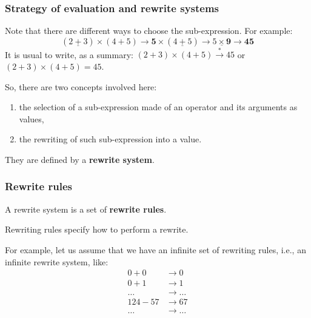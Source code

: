 %
\begin{frame}
\frametitle{Strategy of evaluation and rewrite systems}

Note that there are different ways to choose the sub-expression. For
example:
\[
(\underline{2+3}) \times (4+5) \rightarrow \textbf{5} \times
(\underline{4+5}) \rightarrow \underline{5 \times \textbf{9}}
\rightarrow \textbf{45}
\]
It is usual to write, as a summary: \((2+3)\times(4+5)
\xrightarrow{*} 45\) or \((2+3)\times(4+5)=45\).

\bigskip

So, there are two concepts involved here:
\begin{enumerate}

  \item the selection of a sub-expression made of an operator and its
    arguments as values,

  \item the rewriting of such sub-expression into a value.

\end{enumerate}

They are defined by a \textbf{rewrite system}.

\end{frame}

%
\begin{frame}
\frametitle{Rewrite rules}

A rewrite system is a set of \textbf{rewrite rules}.

\bigskip

Rewriting rules specify how to perform a rewrite.

\bigskip

For example, let us assume that we have an infinite set of rewriting
rules, i.e., an infinite rewrite system, like:
\begin{align*}
0 + 0 & \rightarrow 0\\
0 + 1 & \rightarrow 1\\
\dots & \rightarrow \dots\\
124 - 57 & \rightarrow 67\\
\dots & \rightarrow \dots
\end{align*}

\end{frame}

